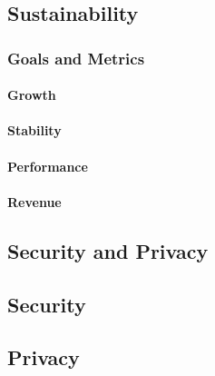 \documentclass[11pt]{article}
\begin{document}
\subsection{Sustainability}
\subsubsection{Goals and Metrics}
\paragraph{Growth}
\paragraph{Stability}
\paragraph{Performance}
\paragraph{Revenue}

\subsection{Security and Privacy}
\subsection{Security}
\subsection{Privacy}

\newpage
\printbibliography
\end{document}
